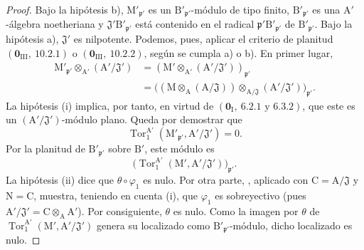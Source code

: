 \begin{proof}
Bajo la hipótesis b), $\mathrm{M}'_{\mathfrak{p}'}$ es un
$\mathrm{B}'_{\mathfrak{p}'}$-módulo de tipo finito,
$\mathrm{B}'_{\mathfrak{p}'}$ es una
$\mathrm{A}'$-álgebra noetheriana y
$\mathfrak{J}'\mathrm{B}'_{\mathfrak{p}'}$ está contenido en el radical
$\mathfrak{p}'\mathrm{B}'_{\mathfrak{p}'}$ de
$\mathrm{B}'_{\mathfrak{p}'}$. Bajo la hipótesis a),
$\mathfrak{J}'$ es nilpotente. Podemos, pues, aplicar el criterio de planitud
$(\mathbf{0}_{\mathrm{III}},~10.2.1)$ o
$(\mathbf{0}_{\mathrm{III}},~10.2.2)$, según se cumpla a) o b).
En primer lugar,
\[
\begin{split}
  \mathrm{M}'_{\mathfrak{p}'}\otimes_{\mathrm{A}'}
    (\mathrm{A}'/\mathfrak{J}')
  &=(\mathrm{M}'\otimes_{\mathrm{A}'}
    (\mathrm{A}'/\mathfrak{J}'))_{\mathfrak{p}'}\\
  &=\bigl((\mathrm{M}\otimes_\mathrm{A}
    (\mathrm{A}/\mathfrak{J}))
    \otimes_{\mathrm{A}/\mathfrak{J}}
    (\mathrm{A}'/\mathfrak{J}')\bigr)_{\mathfrak{p}'}.
\end{split}
\]
La hipótesis (i) implica, por tanto, en virtud de
$(\mathbf{0}_\mathrm{I},~6.2.1\text{ y }6.3.2)$, que este es un
$(\mathrm{A}'/\mathfrak{J}')$-módulo plano. Queda por demostrar que
\[
  \operatorname{Tor}_1^{\mathrm{A}'}
  (\mathrm{M}'_{\mathfrak{p}'},\mathrm{A}'/\mathfrak{J}')=0.
\]
Por la planitud de $\mathrm{B}'_{\mathfrak{p}'}$ sobre $\mathrm{B}'$, este
módulo es
\[
  \bigl(\operatorname{Tor}_1^{\mathrm{A}'}
  (\mathrm{M}',\mathrm{A}'/\mathfrak{J}')\bigr)_{\mathfrak{p}'}.
\]
La hipótesis (ii) dice que $\theta\circ\varphi_1$ es nulo. Por otra
parte, , aplicado con
$\mathrm{C}=\mathrm{A}/\mathfrak{J}$ y $\mathrm{N}=\mathrm{C}$,
muestra, teniendo en cuenta (i), que $\varphi_1$ es sobreyectivo
(pues $\mathrm{A}'/\mathfrak{J}'=\mathrm{C}\otimes_\mathrm{A}
\mathrm{A}'$). Por consiguiente, $\theta$ es nulo. Como la imagen por $\theta$
de $\operatorname{Tor}_1^{\mathrm{A}'}
(\mathrm{M}',\mathrm{A}'/\mathfrak{J}')$ genera su localizado como
$\mathrm{B}'_{\mathfrak{p}'}$-módulo, dicho localizado es nulo.
\end{proof}

